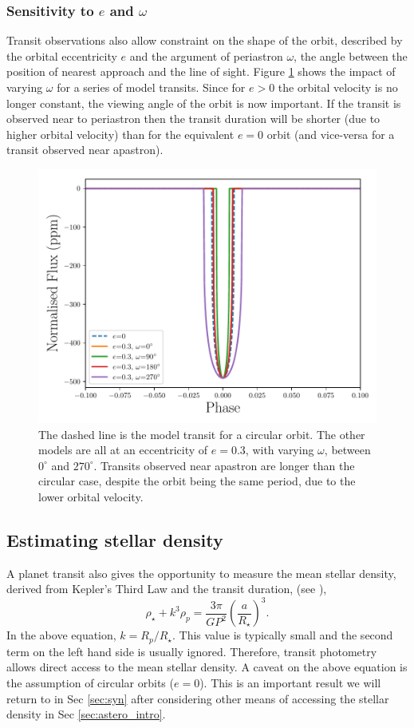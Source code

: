 \subsubsection{Sensitivity to $e$ and $\omega$}
Transit observations also allow constraint on the shape of the orbit, described by the orbital eccentricity $e$  and the argument of periastron $\omega$, the angle between the position of nearest approach and the line of sight. Figure \ref{fig:tran_eccw} shows the impact of varying $\omega$ for a series of model transits. Since for $e>0$ the orbital velocity is no longer constant, the viewing angle of the orbit is now important. If the transit is observed near to periastron then the transit duration will be shorter (due to higher orbital velocity) than for the equivalent $e=0$ orbit (and vice-versa for a transit observed near apastron).
\begin{figure}[H]
\centering
\includegraphics[width=0.75\columnwidth]{eccw}
\caption{The dashed line is the model transit for a circular orbit. The other models are all at an eccentricity of $e=0.3$, with varying $\omega$, between $0^{\circ}$ and $270^{\circ}$. Transits observed near apastron are longer than the circular case, despite the orbit being the same period, due to the lower orbital velocity.}
\label{fig:tran_eccw}
\end{figure}

\subsection{Estimating stellar density}
A planet transit also gives the opportunity to measure the mean stellar density, derived from Kepler's Third Law and the transit duration, (see \citealt{Winn2010}),
\begin{equation}
\rho_{\star}+k^{3}\rho_{p}=\frac{3\pi}{GP^{2}}\left(\frac{a}{R_{\star}}\right)^{3}.
\label{eq:intro_dens}
\end{equation}
In the above equation, $k=R_{p}/R_{\star}$. This value is typically small and the second term on the left hand side is usually ignored. Therefore, transit photometry allows direct access to the mean stellar density. A caveat on the above equation is the assumption of circular orbits ($e=0$). This is an important result we will return to in Sec \ref{sec:syn} after considering other means of accessing the stellar density in Sec \ref{sec:astero_intro}.

